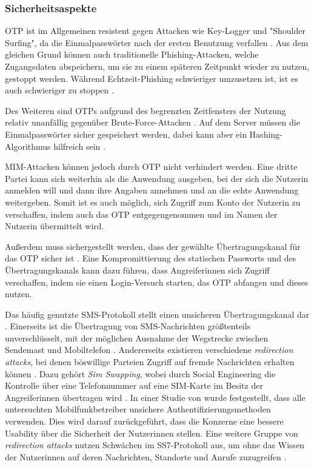 \subsubsection{Sicherheitsaspekte}

\ac{OTP} ist im Allgemeinen resistent gegen Attacken wie Key-Logger und "Shoulder Surfing", da die Einmalpasswörter nach der ersten Benutzung verfallen \parencite{abhishekComprehensiveStudy2013}. Aus dem gleichen Grund können auch traditionelle Phishing-Attacken, welche Zugangsdaten abspeichern, um sie zu einem späteren Zeitpunkt wieder zu nutzen, gestoppt werden. Während Echtzeit-Phishing schwieriger umzusetzen ist, ist es auch schwieriger zu stoppen \parencite{langSecurityKeys2017}.

Des Weiteren sind \acp{OTP} aufgrund des begrenzten Zeitfensters der Nutzung relativ unanfällig gegenüber Brute-Force-Attacken \parencite{reeseUsabilityStudy2019}. Auf dem Server müssen die Einmalpasswörter sicher gespeichert werden, dabei kann aber ein Hashing-Algorithmus hilfreich sein \parencite{reeseUsabilityStudy2019}.

\ac{MIM}-Attacken können jedoch durch \ac{OTP} nicht verhindert werden. Eine dritte Partei kann sich weiterhin als die Anwendung ausgeben, bei der sich die Nutzerin anmelden will und dann ihre Angaben annehmen und an die echte Anwendung weitergeben. Somit ist es auch möglich, sich Zugriff zum Konto der Nutzerin zu verschaffen, indem auch das \ac{OTP} entgegengenommen und im Namen der Nutzerin übermittelt wird.

\pskip
Außerdem muss sichergestellt werden, dass der gewählte Übertragungskanal für das \ac{OTP} sicher ist \parencite{abhishekComprehensiveStudy2013}. Eine Kompromittierung des statischen Passworts und des Übertragungskanals kann dazu führen, dass Angreiferinnen sich Zugriff verschaffen, indem sie einen Login-Versuch starten, das \ac{OTP} abfangen und dieses nutzen.

Das häufig genutzte SMS-Protokoll stellt einen unsicheren Übertragungskanal dar \parencite{peetersSMSOTP2022}. Einerseits ist die Übertragung von SMS-Nachrichten größtenteils unverschlüsselt, mit der möglichen Ausnahme der Wegstrecke zwischen Sendemast und Mobiltelefon \parencite{peetersSMSOTP2022}. Andererseits existieren verschiedene \textit{redirection attacks}, bei denen böswillige Parteien Zugriff auf fremde Nachrichten erhalten können \parencite{peetersSMSOTP2022}. Dazu gehört \textit{Sim Swapping}, wobei durch Social Engineering die Kontrolle über eine Telefonnummer auf eine SIM-Karte im Besitz der Angreiferinnen übertragen wird \parencite{leeEmpiricalStudy2020}. In einer Studie von \textcite{leeEmpiricalStudy2020} wurde festgestellt, dass alle untersuchten Mobilfunkbetreiber unsichere Authentifizierungsmethoden verwenden. Dies wird darauf zurückgeführt, dass die Konzerne eine bessere Usability über die Sicherheit der Nutzerinnen stellen. Eine weitere Gruppe von \textit{redirection attacks} nutzen Schwächen im \ac{SS7}-Protokoll aus, um ohne das Wissen der Nutzerinnen auf deren Nachrichten, Standorte und Anrufe zuzugreifen \parencite{ullahSS7Vulnerabilities2020}.

